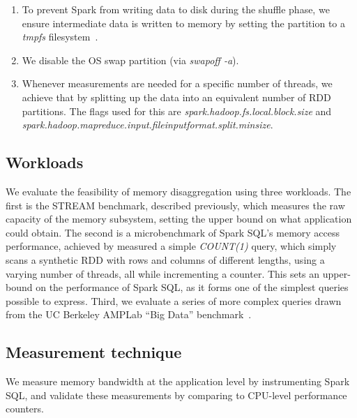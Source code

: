 \documentclass{sig-alternate-05-2015}
\begin{document}
\begin{enumerate}
\item To prevent Spark from writing data to disk during the shuffle phase, we
ensure intermediate data is written to memory by setting the partition to a
{\it tmpfs} filesystem~\cite{WikiTmpfs}.

\item We disable the OS swap partition (via {\it swapoff -a}).

\item Whenever measurements are needed for a specific number of threads, we
achieve that by splitting up the data into an equivalent number of RDD
partitions. The flags used for this are
{\it spark.hadoop.\-fs.local.\-block.\-size} and
{\it spark.hadoop.mapreduce.\-input.file\-input\-format.\-split.minsize}.

\end{enumerate}

\subsection{Workloads}
\label{sec:workloads}

We evaluate the feasibility of memory disaggregation using three workloads.
The first is the STREAM benchmark, described previously, which measures the raw
capacity of the memory subsystem, setting the upper bound on what application
could obtain.  The second is a microbenchmark of Spark SQL's memory access
performance, achieved by measured a simple {\it COUNT(1)} query, which simply
scans a synthetic RDD with rows and columns of different lengths, using a
varying number of threads, all while incrementing a counter.  This sets an
upper-bound on the performance of Spark SQL, as it forms one of the simplest
queries possible to express.
Third, we evaluate a series of more complex queries drawn from the UC Berkeley
AMPLab ``Big Data'' benchmark~\cite{bigDataBenchmark}.

\subsection{Measurement technique}
\label{sec:measurement}

We measure memory bandwidth at the application level by instrumenting Spark
SQL, and validate these measurements by comparing to CPU-level performance
counters.
\end{document}
